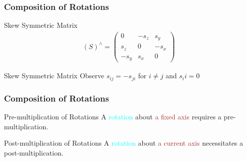 \begin{frame}
	\frametitle{Composition of Rotations}
	\begin{block}{Skew Symmetric Matrix}
		\begin{align}
			(S)^\wedge = \left(\begin{array}{ccc}
				0 & -s_z & s_y \\
				s_z & 0 & -s_x \\
				-s_y & s_x & 0 
			\end{array}\right)
		\end{align}
	\end{block}

\begin{block}{Skew Symmetric Matrix}
%
Observe $s_{ij} = -s_{ji}$ for $i\neq j$ and $s_ii=0$
\end{block}
\end{frame}


\begin{frame}
	\frametitle{Composition of Rotations}
			\begin{block}{Pre-multiplication of Rotations}
				A \textcolor{cyan}{rotation} about \textcolor{brown}{a fixed axis} requires a \textcolor{light-blue}{pre-multiplication}.
			\end{block}
		
		\begin{block}{Post-multiplication of Rotations}
			A \textcolor{cyan}{rotation} about \textcolor{brown}{a current axis} necessitates a \textcolor{light-blue}{post-multiplication}.
		\end{block}
\end{frame}



